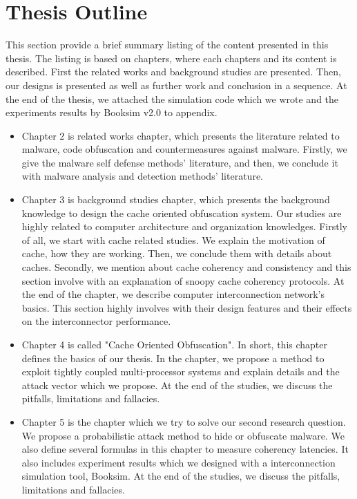 \section{Thesis Outline}

	This section provide a brief summary listing of the content presented in this thesis. The listing is based on chapters, where each chapters and its content is described. First the related works and background studies are presented. Then, our designs is presented as well as further work and conclusion in a sequence. At the end of the thesis, we attached the simulation code which we wrote and the experiments results by Booksim v2.0 to appendix.
	
\begin{itemize}
	\item Chapter 2 is related works chapter, which presents the literature related to malware, code obfuscation and countermeasures against malware. Firstly, we give the malware self defense methods' literature, and then, we conclude it with malware analysis and detection methods' literature.
	\item Chapter 3 is background studies chapter, which presents the background knowledge to design the cache oriented obfuscation system. Our studies are highly related to computer architecture and organization knowledges. Firstly of all, we start with cache related studies. We explain the motivation of cache, how they are working. Then, we conclude them with details about caches. Secondly, we mention about cache coherency and consistency and this section involve with an explanation of snoopy cache coherency protocols. At the end of the chapter, we describe computer interconnection network's basics. This section highly involves with their design features and their effects on the interconnector performance.
	\item Chapter 4 is called "Cache Oriented Obfuscation". In short, this chapter defines the basics of our thesis. In the chapter, we propose a method to exploit tightly coupled multi-processor systems and explain details and the attack vector which we propose. At the end of the studies, we discuss the pitfalls, limitations and fallacies.
	\item Chapter 5 is the chapter which we try to solve our second research question. We propose a probabilistic attack method to hide or obfuscate malware. We also define several formulas in this chapter to measure coherency latencies. It also includes experiment results which we designed with a interconnection simulation tool, Booksim. At the end of the studies, we discuss the pitfalls, limitations and fallacies.

\end{itemize}
